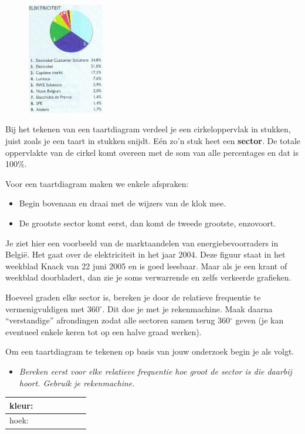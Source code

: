 \documentclass[11pt]{article}
\newcommand{\vraag}[2]{\begin{itemize}\item {\it #1} \vspace*{#2}\end{itemize}}
\newcommand{\degree}{\ensuremath{^\circ}}
\begin{document}
\begin{figure}
  \vspace{-0.3cm}
  \includegraphics[width=0.3\textwidth]{cirkeldiagram_electriciteit}
\end{figure}

Bij het tekenen van een taartdiagram verdeel je een cirkeloppervlak in stukken, juist zoals je een
taart in stukken snijdt. Eén zo'n stuk heet een {\bf sector}. De totale oppervlakte van de cirkel komt overeen
met de som van alle percentages en dat is 100\%.

Voor een taartdiagram maken we enkele afspraken:
\begin{itemize}
  \item Begin bovenaan en draai met de wijzers van de klok mee.
  \item De grootste sector komt eerst, dan komt de tweede
grootste, enzovoort.
\end{itemize}

Je ziet hier een voorbeeld van de marktaandelen van
energiebevoorraders in België. Het gaat over de elektriciteit in
het jaar 2004. Deze figuur staat in het weekblad Knack van 22
juni 2005 en is goed leesbaar. Maar als je een krant of
weekblad doorbladert, dan zie je soms verwarrende en zelfs
verkeerde grafieken.

Hoeveel graden elke sector is, bereken je door de relatieve
frequentie te vermenigvuldigen met $360\degree$. Dit doe je met je
rekenmachine. Maak daarna “verstandige” afrondingen zodat
alle sectoren samen terug $360\degree$ geven (je kan
eventueel enkele keren tot op een halve graad werken).

Om een taartdiagram te tekenen op basis van jouw onderzoek begin je als volgt.
\vraag{Bereken eerst voor elke relatieve frequentie hoe groot de sector is die daarbij hoort. Gebruik
je rekenmachine.}{0cm}

\begin{center}
  \begin{tabular}{|p{1.5cm}|p{1.5cm}|p{1.5cm}|p{1.5cm}|p{1.5cm}|p{1.5cm}|p{1.5cm}|}
    \hline
    kleur:\vspace{0.5cm}&&&&&&\\
    \hline
    hoek:\vspace{0.5cm}&&&&&&\\
    \hline
  \end{tabular}
\end{center}
\end{document}
